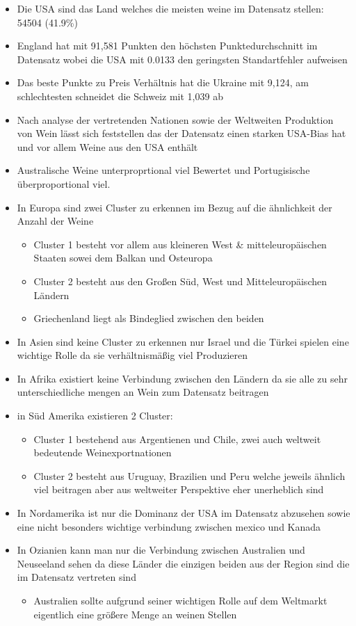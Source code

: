 \documentclass[
]{article}
\providecommand{\tightlist}{%
  \setlength{\itemsep}{0pt}\setlength{\parskip}{0pt}}
\begin{document}
\begin{itemize}
\item
  Die USA sind das Land welches die meisten weine im Datensatz stellen:
  54504 (41.9\%)
\item
  England hat mit 91,581 Punkten den höchsten Punktedurchschnitt im
  Datensatz wobei die USA mit 0.0133 den geringsten Standartfehler
  aufweisen
\item
  Das beste Punkte zu Preis Verhältnis hat die Ukraine mit 9,124, am
  schlechtesten schneidet die Schweiz mit 1,039 ab
\item
  Nach analyse der vertretenden Nationen sowie der Weltweiten Produktion
  von Wein lässt sich feststellen das der Datensatz einen starken
  USA-Bias hat und vor allem Weine aus den USA enthält
\item
  Australische Weine unterproprtional viel Bewertet und Portugisische
  überproportional viel.
\item
  In Europa sind zwei Cluster zu erkennen im Bezug auf die ähnlichkeit
  der Anzahl der Weine

  \begin{itemize}
  \item
    Cluster 1 besteht vor allem aus kleineren West \& mitteleuropäischen
    Staaten sowei dem Balkan und Osteuropa
  \item
    Cluster 2 besteht aus den Großen Süd, West und Mitteleuropäischen
    Ländern
  \item
    Griechenland liegt als Bindeglied zwischen den beiden
  \end{itemize}
\item
  In Asien sind keine Cluster zu erkennen nur Israel und die Türkei
  spielen eine wichtige Rolle da sie verhältnismäßig viel Produzieren
\item
  In Afrika existiert keine Verbindung zwischen den Ländern da sie alle
  zu sehr unterschiedliche mengen an Wein zum Datensatz beitragen
\item
  in Süd Amerika existieren 2 Cluster:

  \begin{itemize}
  \item
    Cluster 1 bestehend aus Argentienen und Chile, zwei auch weltweit
    bedeutende Weinexportnationen
  \item
    Cluster 2 besteht aus Uruguay, Brazilien und Peru welche jeweils
    ähnlich viel beitragen aber aus weltweiter Perspektive eher
    unerheblich sind
  \end{itemize}
\item
  In Nordamerika ist nur die Dominanz der USA im Datensatz abzusehen
  sowie eine nicht besonders wichtige verbindung zwischen mexico und
  Kanada
\item
  In Ozianien kann man nur die Verbindung zwischen Australien und
  Neuseeland sehen da diese Länder die einzigen beiden aus der Region
  sind die im Datensatz vertreten sind

  \begin{itemize}
  \tightlist
  \item
    Australien sollte aufgrund seiner wichtigen Rolle auf dem Weltmarkt
    eigentlich eine größere Menge an weinen Stellen
  \end{itemize}
\end{itemize}
\end{document}
